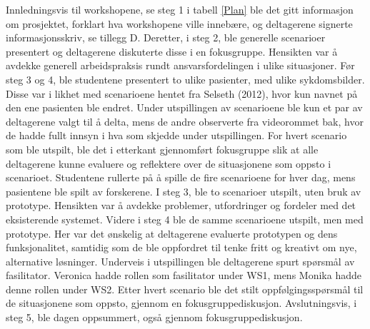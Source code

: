 \noindent
Innledningsvis til workshopene, se steg 1 i tabell \ref{Plan} ble det gitt informasjon om prosjektet, forklart hva workshopene ville innebære, og deltagerene signerte informasjonsskriv, se tillegg D. Deretter, i steg 2, ble generelle scenarioer presentert og deltagerene diskuterte disse i en fokusgruppe. Hensikten var å avdekke generell arbeidspraksis rundt ansvarsfordelingen i ulike situasjoner.
Før steg 3 og 4, ble studentene presentert to ulike pasienter, med ulike sykdomsbilder. Disse var i likhet med scenarioene hentet fra Selseth (2012), hvor kun navnet på den ene pasienten ble endret. Under utspillingen av scenarioene ble kun et par av deltagerene valgt til å delta, mens de andre observerte fra videorommet bak, hvor de hadde fullt innsyn i hva som skjedde under utspillingen. For hvert scenario som ble utspilt, ble det i etterkant gjennomført fokusgruppe slik at alle deltagerene kunne evaluere og  reflektere over de situasjonene som oppsto i scenarioet. Studentene rullerte på å spille de fire scenarioene for hver dag, mens pasientene ble spilt av forskerene. I steg 3, ble to scenarioer utspilt, uten bruk av prototype. Hensikten var å avdekke problemer, utfordringer og fordeler med det eksisterende systemet. Videre i steg 4 ble de samme scenarioene utspilt, men med prototype. Her var det ønskelig at deltagerene evaluerte prototypen og dens funksjonalitet, samtidig som de ble oppfordret til tenke fritt og kreativt om nye, alternative løsninger. Underveis i utspillingen ble deltagerene spurt spørsmål av fasilitator. Veronica hadde rollen som fasilitator under WS1, mens Monika hadde denne rollen under WS2. Etter hvert scenario ble det stilt oppfølgingsspørsmål til de situasjonene som oppsto, gjennom en fokusgruppediskusjon. Avslutningsvis, i steg 5, ble dagen oppsummert, også gjennom fokusgruppediskusjon. 





